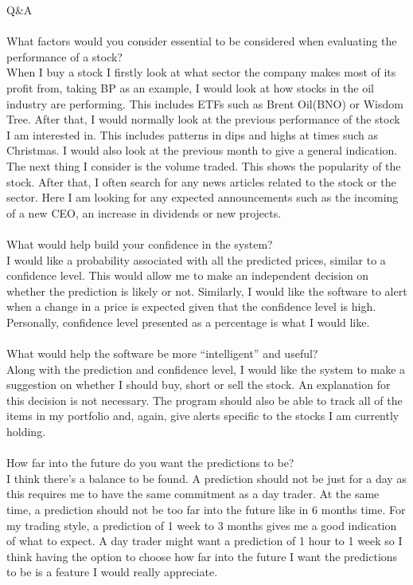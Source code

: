 \documentclass{article}
\begin{document}
Q\&A
\\\\
What factors would you consider essential to be considered when evaluating the performance of a stock?\\
When I buy a stock I firstly look at what sector the company makes most of its profit from, taking BP as an example, I would look at how stocks in the oil industry are performing. This includes ETFs such as Brent Oil(BNO) or Wisdom Tree. After that, I would normally look at the previous performance of the stock I am interested in. This includes patterns in dips and highs at times such as Christmas. I would also look at the previous month to give a general indication. The next thing I consider is the volume traded. This shows the popularity of the stock. After that, I often search for any news articles related to the stock or the sector. Here I am looking for any expected announcements such as the incoming of a new CEO, an increase in dividends or new projects.
\\\\
What would help build your confidence in the system?
\\
I would like a probability associated with all the predicted prices, similar to a confidence level. This would allow me to make an independent decision on whether the prediction is likely or not. Similarly, I would like the software to alert when a change in a price is expected given that the confidence level is high. Personally, confidence level presented as a percentage is what I would like.
\\\\
What would help the software be more “intelligent” and useful?\\
Along with the prediction and confidence level, I would like the system to make a suggestion on whether I should buy, short or sell the stock. An explanation for this decision is not necessary. The program should also be able to track all of the items in my portfolio and, again, give alerts specific to the stocks I am currently holding.
\\\\
How far into the future do you want the predictions to be?\\
I think there’s a balance to be found. A prediction should not be just for a day as this requires me to have the same commitment as a day trader. At the same time, a prediction should not be too far into the future like in 6 months time. For my trading style, a prediction of 1 week to 3 months gives me a good indication of what to expect. A day trader might want a prediction of 1 hour to 1 week so I think having the option to choose how far into the future I want the predictions to be is a feature I would really appreciate.
\end{document}
